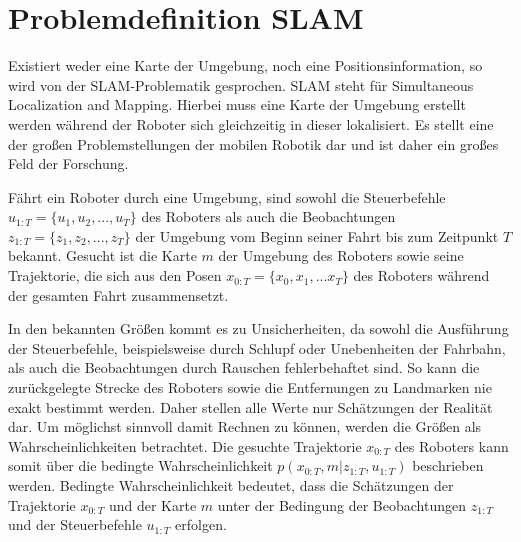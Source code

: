 
%
%

\section[Problemdefinition SLAM (Kopp)]{Problemdefinition SLAM}

Existiert weder eine Karte der Umgebung, noch eine Positionsinformation, so wird von der SLAM-Problematik gesprochen. SLAM steht für Simultaneous Localization and Mapping. Hierbei muss eine Karte der Umgebung erstellt werden während der Roboter sich gleichzeitig in dieser lokalisiert. Es stellt eine der großen Problemstellungen der mobilen Robotik dar und ist daher ein großes Feld der Forschung.

Fährt ein Roboter durch eine Umgebung, sind sowohl die Steuerbefehle $u_{1:T}=\{u_1,u_2,...,u_T\}$ des Roboters als auch die Beobachtungen $z_{1:T}=\{z_1,z_2,...,z_T\}$ der Umgebung vom Beginn seiner Fahrt bis zum Zeitpunkt $T$ bekannt. Gesucht ist die Karte $m$ der Umgebung des Roboters sowie seine Trajektorie, die sich aus den Posen $x_{0:T}=\{x_0,x_1,...x_T\}$ des Roboters während der gesamten Fahrt zusammensetzt.

In den bekannten Größen kommt es zu Unsicherheiten, da sowohl die Ausführung der Steuerbefehle, beispielsweise durch Schlupf oder Unebenheiten der Fahrbahn, als auch die Beobachtungen durch Rauschen fehlerbehaftet sind. So kann die zurückgelegte Strecke des Roboters sowie die Entfernungen zu Landmarken nie exakt be\-stimmt werden. Daher stellen alle Werte nur Schätzungen der Realität dar. Um möglichst sinnvoll damit Rechnen zu können, werden die Größen als Wahrscheinlichkeiten betrachtet. Die gesuchte Trajektorie $x_{0:T}$ des Roboters kann somit über die bedingte Wahrscheinlichkeit $p(x_{0:T},m|z_{1:T},u_{1:T})$ beschrieben werden. Bedingte Wahrscheinlichkeit bedeutet, dass die Schätzungen der Trajektorie $x_{0:T}$ und der Karte $m$ unter der Bedingung der Beobachtungen $z_{1:T}$ und der Steuerbefehle $u_{1:T}$ erfolgen. 


